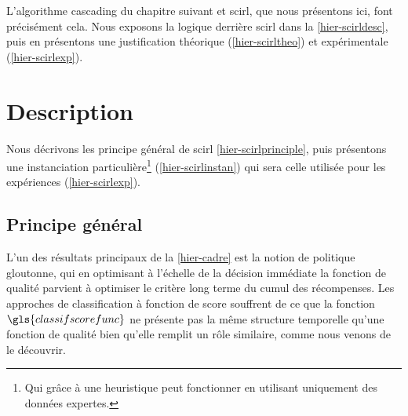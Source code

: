 \documentclass[frenchb,a4paper,justified,notoc]{tufte-book}
\newcommand{\classifscorefunc}{\gls{classifscorefunc}}
\begin{document}
L'algorithme \gls{cascading} du chapitre suivant et \gls{scirl}, que nous présentons ici, font précisément cela. Nous exposons la logique derrière \gls{scirl} dans la \autoref{hier-scirldesc}, puis en présentons une justification théorique (\autoref{hier-scirltheo}) et expérimentale (\autoref{hier-scirlexp}).
\section{Description}
\label{sec-5-2}
\label{hier-scirldesc}


   
Nous décrivons les principe général de \gls{scirl} \autoref{hier-scirlprinciple}, puis présentons une instanciation particulière\footnote{Qui grâce à une heuristique peut fonctionner en utilisant uniquement des données expertes.
 } (\autoref{hier-scirlinstan}) qui sera celle utilisée pour les expériences (\autoref{hier-scirlexp}).
\subsection{Principe général}
\label{sec-5-2-1}
\label{hier-scirlprinciple}


   L'un des résultats principaux de la \autoref{hier-cadre} est la notion de politique gloutonne, qui en optimisant à l'échelle de la décision immédiate la fonction de qualité parvient à optimiser le critère long terme du cumul des récompenses. Les approches de classification à fonction de score souffrent de ce que la fonction $\classifscorefunc$ ne présente pas la même structure temporelle qu'une fonction de qualité bien qu'elle remplit un rôle similaire, comme nous venons de le découvrir. 
\end{document}
